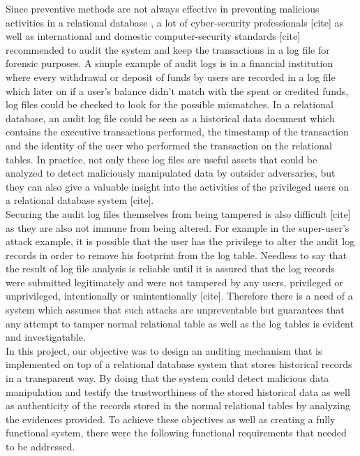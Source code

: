 Since preventive methods are not always effective in preventing malicious activities in a relational database \cite{Ammann2002recovery}, a lot of cyber-security professionals [cite] as well as international and domestic computer-security standards [cite] recommended to audit the system and keep the transactions in a log file for forensic purposes. A simple example of audit logs is in a financial institution where every withdrawal or deposit of funds by users are recorded in a log file which later on if a user’s balance didn’t match with the spent or credited funds, log files could be checked to look for the possible mismatches. In a relational database, an audit log file could be seen as a historical data document which contains the executive transactions performed, the timestamp of the transaction and the identity of the user who performed the transaction on the relational tables. In practice, not only these log files are useful assets that could be analyzed to detect maliciously manipulated data by outsider adversaries, but they can also give a valuable insight into the activities of the privileged users on a relational database system [cite].\\
Securing the audit log files themselves from being tampered is also difficult [cite] as they are also not immune from being altered. For example in the super-user’s attack example, it is possible that the user has the privilege to alter the audit log records in order to remove his footprint from the log table. Needless to say that the result of log file analysis is reliable until it is assured that the log records were submitted legitimately and were not tampered by any users, privileged or unprivileged, intentionally or unintentionally [cite]. Therefore there is a need of a system which assumes that such attacks are unpreventable but guarantees that any attempt to tamper normal relational table as well as the log tables is evident and investigatable.\\
In this project, our objective was to design an auditing mechanism that is implemented on top of a relational database system that stores historical records in a transparent way. By doing that the system could detect malicious data manipulation and testify the trustworthiness of the stored historical data as well as authenticity of the records stored in the normal relational tables by analyzing the evidences provided. To achieve these objectives as well as creating a fully functional system, there were the following functional requirements that needed to be addressed.
